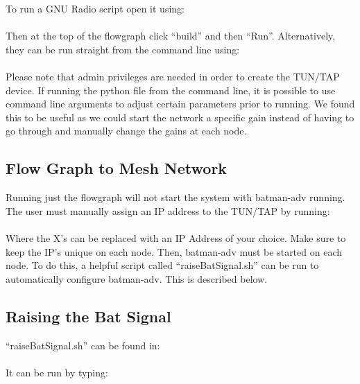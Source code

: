 To run a GNU Radio script open it using: \\

 \\

Then at the top of the flowgraph click ``build'' and then ``Run''. Alternatively, they can be run straight from the command line using: \\

 \\

Please note that admin privileges are needed in order to create the TUN/TAP device. If running the python file from the command line, it is possible to use command line arguments to adjust certain parameters prior to running. We found this to be useful as we could start the network a specific gain instead of having to go through and manually change the gains at each node. 

\subsection{Flow Graph to Mesh Network}

Running just the flowgraph will not start the system with batman-adv running. The user must manually assign an IP address to the TUN/TAP by running: \\

 \\

Where the X's can be replaced with an IP Address of your choice. Make sure to keep the IP's unique on each node. Then, batman-adv must be started on each node. To do this, a helpful script called ``raiseBatSignal.sh'' can be run to automatically configure batman-adv. This is described below. 

\subsection{Raising the Bat Signal}

``raiseBatSignal.sh'' can be found in: \\ 

 \\

It can be run by typing: \\

 \\

